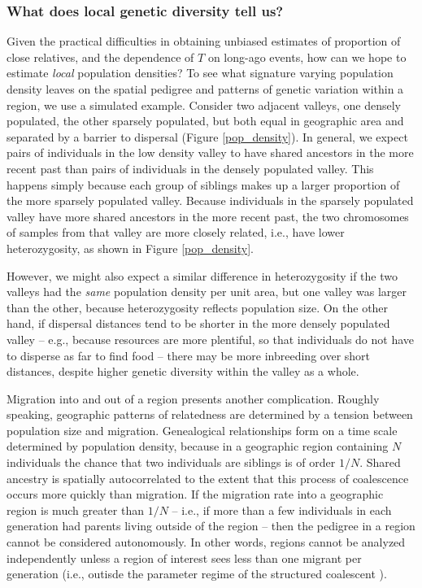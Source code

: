\documentclass{ar-1col}
\begin{document}
\subsubsection{What does local genetic diversity tell us?}

Given the practical difficulties in obtaining unbiased estimates of proportion of close relatives,
and the dependence of $T$ on long-ago events,
how can we hope to estimate \textit{local} population densities?
To see what signature varying population density leaves 
on the spatial pedigree and patterns of genetic variation
within a region,
we use a simulated example.
Consider two adjacent valleys, 
one densely populated, the other sparsely populated, 
but both equal in geographic area 
and separated by a barrier to dispersal (Figure \ref{pop_density}).
In general, we expect pairs of individuals in the low density valley 
to have shared ancestors in the more recent past than 
pairs of individuals in the densely populated valley.
This happens simply because 
each group of siblings makes up a larger proportion 
of the more sparsely populated valley.
Because individuals in the sparsely populated valley have more shared ancestors 
in the more recent past, 
the two chromosomes of samples from that valley are more closely related,
i.e., have lower heterozygosity, as shown in Figure \ref{pop_density}.

However, we might also expect a similar difference in heterozygosity
if the two valleys had the \textit{same} population density per unit area,
but one valley was larger than the other,
because heterozygosity reflects population size.
On the other hand, if dispersal distances tend to be shorter
in the more densely populated valley -- 
e.g., because resources are more plentiful, 
so that individuals do not have to disperse as far to find food -- 
there may be more inbreeding over short distances,
despite higher genetic diversity within the valley as a whole.


Migration into and out of a region presents another complication.
Roughly speaking,
geographic patterns of relatedness
are determined by a tension between population size and migration.
Genealogical relationships form on a time scale determined by population density,
because in a geographic region containing $N$ individuals
the chance that two individuals are siblings is of order $1/N$.
Shared ancestry is spatially autocorrelated
to the extent that this process of coalescence
occurs more quickly than migration.
If the migration rate into a geographic region is much greater than $1/N$ --
i.e., if more than a few individuals in each generation had parents living outside of the region --
then the pedigree in a region cannot be considered autonomously.
In other words,
regions cannot be analyzed independently
unless a region of interest sees less than one migrant per generation
(i.e., outisde the parameter regime of the structured coalescent \citep{nagylaki1998}).
\end{document}
